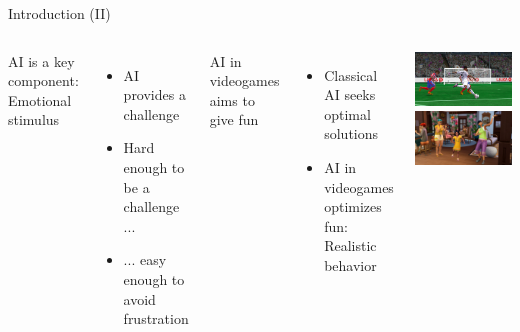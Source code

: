 \documentclass[10pt,compress]{beamer} %
\begin{document}
\begin{frame}{Introduction (II)}

    \begin{columns}
	\vspace{-0.5cm}
	    AI is a key component: \alert{Emotional stimulus}
	        \begin{itemize}
	    	\item AI provides a challenge
	    	\item Hard enough to be a challenge ...
	    	\item ... easy enough to avoid frustration
    	    \end{itemize}
    	AI in videogames aims to give fun
	        \begin{itemize}
		    \item Classical AI seeks optimal solutions
		    \item AI in videogames optimizes fun: Realistic behavior
  	        \end{itemize}

		    \includegraphics[width=\linewidth]{figs/fifa.png}\\
            \bigskip
		    \includegraphics[width=\linewidth]{figs/thesims.jpg}
    \end{columns}
\end{frame}
\end{document}
